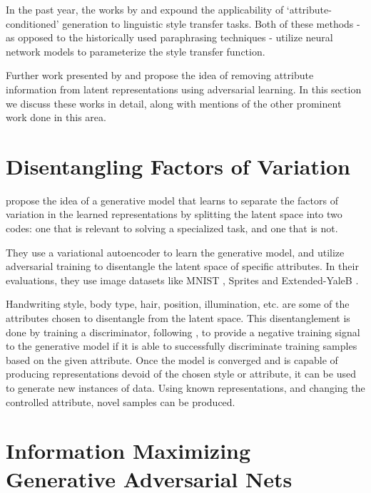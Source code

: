 In the past year, the works by \cite{hu2017toward} and \cite{ficler2017controlling} expound the applicability of `attribute-conditioned' generation to linguistic style transfer tasks. Both of these methods - as opposed to the historically used paraphrasing techniques \citep{xu2012paraphrasing} - utilize neural network models \citep{lecun2015deep} to parameterize the style transfer function.

Further work presented by \cite{shen2017style} and \cite{fu2017style} propose the idea of removing attribute information from latent representations using adversarial learning. In this section we discuss these works in detail, along with mentions of the other prominent work done in this area.


\section{Disentangling Factors of Variation}

\cite{mathieu2016disentangling} propose the idea of a generative model that learns to separate the factors of variation in the learned representations by splitting the latent space into two codes: one that is relevant to solving a specialized task, and one that is not.

They use a variational autoencoder to learn the generative model, and utilize adversarial training to disentangle the latent space of specific attributes. In their evaluations, they use image datasets like MNIST \citep{lecun2004learning,lecun2010mnist}, Sprites \citep{reed2015deep} and Extended-YaleB \citep{georghiades2001few}.

Handwriting style, body type, hair, position, illumination, etc. are some of the attributes chosen to disentangle from the latent space. This disentanglement is done by training a discriminator, following \cite{goodfellow2014generative}, to provide a negative training signal to the generative model if it is able to successfully discriminate training samples based on the given attribute. Once the model is converged and is capable of producing representations devoid of the chosen style or attribute, it can be used to generate new instances of data. Using known representations, and changing the controlled attribute, novel samples can be produced.


\section{Information Maximizing Generative Adversarial Nets}

